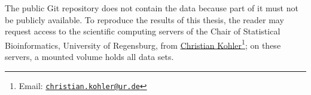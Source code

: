 The public Git repository does not contain the data because part of it must not be publicly 
available. To reproduce the results of this thesis, the reader may request access to the scientific 
computing servers of the Chair of Statistical Bioinformatics, University of Regensburg, from 
\href{mailto:christian.kohler@ur.de}{Christian Kohler}\footnote{Email: 
\href{mailto:christian.kohler@ur.de}{\texttt{christian.kohler@ur.de}}}; on these servers, a mounted
volume holds all data sets.